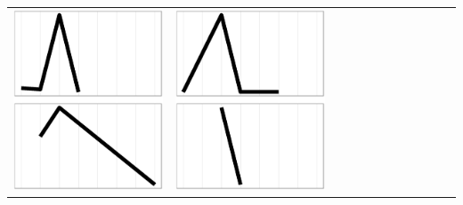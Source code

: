 \documentclass[conference]{worldcomp}
\begin{document}
\begin{table}
\begin{tabular}{ | b{1.5cm} | c | c | c | c | c | c | c | c | c | c | c |}
 \includegraphics[scale=0.08]{figures/bcaa.ps} &  
 \includegraphics[scale=0.08]{figures/bcbb.ps} &  

\end{tabular}
\end{table}
\end{document}
